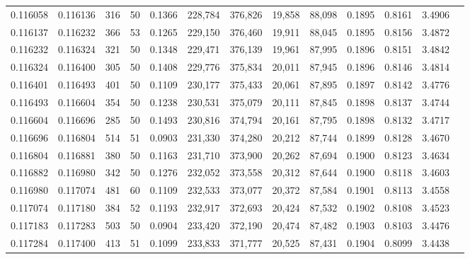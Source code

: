 \begin{tabular}{rrrrrrrrrrrrr}
0.116058 & 0.116136 &   316 &  50 &                                     0.1366 & 228,784 & 376,826 &  19,858 &  88,098 & 0.1895 & 0.8161 & 3.4906 \\
0.116137 & 0.116232 &   366 &  53 &                                     0.1265 & 229,150 & 376,460 &  19,911 &  88,045 & 0.1895 & 0.8156 & 3.4872 \\
0.116232 & 0.116324 &   321 &  50 &                                     0.1348 & 229,471 & 376,139 &  19,961 &  87,995 & 0.1896 & 0.8151 & 3.4842 \\
0.116324 & 0.116400 &   305 &  50 &                                     0.1408 & 229,776 & 375,834 &  20,011 &  87,945 & 0.1896 & 0.8146 & 3.4814 \\
0.116401 & 0.116493 &   401 &  50 &                                     0.1109 & 230,177 & 375,433 &  20,061 &  87,895 & 0.1897 & 0.8142 & 3.4776 \\
0.116493 & 0.116604 &   354 &  50 &                                     0.1238 & 230,531 & 375,079 &  20,111 &  87,845 & 0.1898 & 0.8137 & 3.4744 \\
0.116604 & 0.116696 &   285 &  50 &                                     0.1493 & 230,816 & 374,794 &  20,161 &  87,795 & 0.1898 & 0.8132 & 3.4717 \\
0.116696 & 0.116804 &   514 &  51 &                                     0.0903 & 231,330 & 374,280 &  20,212 &  87,744 & 0.1899 & 0.8128 & 3.4670 \\
0.116804 & 0.116881 &   380 &  50 &                                     0.1163 & 231,710 & 373,900 &  20,262 &  87,694 & 0.1900 & 0.8123 & 3.4634 \\
0.116882 & 0.116980 &   342 &  50 &                                     0.1276 & 232,052 & 373,558 &  20,312 &  87,644 & 0.1900 & 0.8118 & 3.4603 \\
0.116980 & 0.117074 &   481 &  60 &                                     0.1109 & 232,533 & 373,077 &  20,372 &  87,584 & 0.1901 & 0.8113 & 3.4558 \\
0.117074 & 0.117180 &   384 &  52 &                                     0.1193 & 232,917 & 372,693 &  20,424 &  87,532 & 0.1902 & 0.8108 & 3.4523 \\
0.117183 & 0.117283 &   503 &  50 &                                     0.0904 & 233,420 & 372,190 &  20,474 &  87,482 & 0.1903 & 0.8103 & 3.4476 \\
0.117284 & 0.117400 &   413 &  51 &                                     0.1099 & 233,833 & 371,777 &  20,525 &  87,431 & 0.1904 & 0.8099 & 3.4438 \\

\end{tabular}
